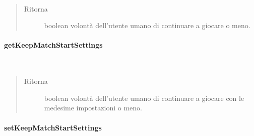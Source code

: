 \documentclass[letterpaper,10pt,italian,openany,oneside]{sphinxmanual}
\begin{document}
\begin{fulllineitems}
\label{\detokenize{source/it/unicam/cs/pa/mastermind/gamecore/StartupSettings:it.unicam.cs.pa.mastermind.gamecore.StartupSettings.getContinue()}}~\begin{quote}\begin{description}
\item[{Ritorna}] \leavevmode
boolean volontà dell’utente umano di continuare a giocare o meno.

\end{description}\end{quote}

\end{fulllineitems}



\paragraph{getKeepMatchStartSettings}
\label{\detokenize{source/it/unicam/cs/pa/mastermind/gamecore/StartupSettings:getkeepmatchstartsettings}}

\begin{fulllineitems}
\label{\detokenize{source/it/unicam/cs/pa/mastermind/gamecore/StartupSettings:it.unicam.cs.pa.mastermind.gamecore.StartupSettings.getKeepMatchStartSettings()}}~\begin{quote}\begin{description}
\item[{Ritorna}] \leavevmode
boolean volontà dell’utente umano di continuare a giocare con le medesime impostazioni o meno.

\end{description}\end{quote}

\end{fulllineitems}



\paragraph{setKeepMatchStartSettings}
\label{\detokenize{source/it/unicam/cs/pa/mastermind/gamecore/StartupSettings:setkeepmatchstartsettings}}
\end{document}
